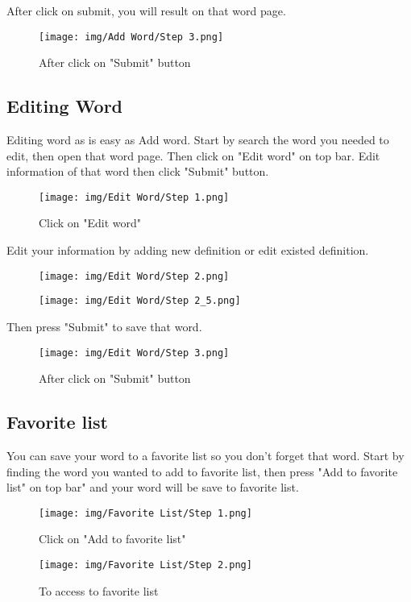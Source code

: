 \documentclass[sn-mathphys,Numbered]{sn-jnl}%
\begin{document}
After click on submit, you will result on that word page.

\begin{figure}[H]
	\centering
	\texttt{[image: img/Add Word/Step 3.png]}
	\caption*{After click on "Submit" button}
\end{figure}

\subsection{Editing Word}
Editing word as is easy as Add word. Start by search the word you needed to edit, then open that word page. Then click on "Edit word" on top bar. Edit information of that word then click "Submit" button.

\begin{figure}[H]
	\centering
	\texttt{[image: img/Edit Word/Step 1.png]}
	\caption*{Click on "Edit word"}
\end{figure}

Edit your information by adding new definition or edit existed definition.

\begin{figure}[H]
	\centering
	\begin{minipage}{0.49\textwidth}
		\texttt{[image: img/Edit Word/Step 2.png]}
	\end{minipage}\hfill
	\begin{minipage}{0.49\textwidth}
		\texttt{[image: img/Edit Word/Step 2\_5.png]}
	\end{minipage}
\end{figure}

Then press "Submit" to save that word.

\begin{figure}[H]
	\centering
	\texttt{[image: img/Edit Word/Step 3.png]}
	\caption*{After click on "Submit" button}
\end{figure}

\subsection{Favorite list}

You can save your word to a favorite list so you don't forget that word. Start by finding the word you wanted to add to favorite list, then press "Add to favorite list" on top bar" and your word will be save to favorite list.

\begin{figure}[H]
	\centering
	\begin{minipage}{0.49\textwidth}
	\texttt{[image: img/Favorite List/Step 1.png]}
	\caption*{Click on "Add to favorite list"}
	\end{minipage}\hfill
	\begin{minipage}{0.49\textwidth}
	\texttt{[image: img/Favorite List/Step 2.png]}
	\caption*{To access to favorite list}
	\end{minipage}
\end{figure}
\end{document}
